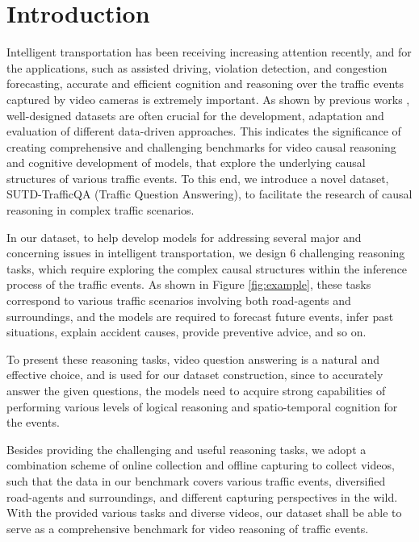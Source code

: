 \documentclass[final]{cvpr}
\begin{document}
\section{Introduction}

Intelligent transportation \cite{5959985} has been receiving increasing attention recently, and for the applications, such as assisted driving, violation detection, and congestion forecasting, accurate and efficient cognition and reasoning over the traffic events captured by video cameras is extremely important. As shown by previous works \cite{10.3115/1073012.1073017,35179}, well-designed datasets are often crucial for the development, adaptation and evaluation of different data-driven approaches. 
This indicates the significance of creating comprehensive and challenging benchmarks for video causal reasoning
and cognitive development of models, 
that explore the underlying causal structures of various traffic events. To this end, we introduce a novel dataset, SUTD-TrafficQA (Traffic Question Answering), to facilitate the research of causal reasoning in complex traffic scenarios.

In our dataset, to help develop models for addressing several major and concerning issues in intelligent transportation, we design 6 challenging reasoning tasks, which require exploring the complex causal structures within the inference process of the traffic events. As shown in Figure \ref{fig:example},
these tasks correspond to various traffic scenarios involving both road-agents and surroundings, and the models are required to forecast future events, infer past situations, explain accident causes, provide preventive advice, and so on. 

To present these reasoning tasks, video question answering \cite{zhu2017uncovering} is a natural and effective choice, and is used for our dataset construction, since to accurately answer the given questions, the models need to acquire strong capabilities of performing various levels of logical reasoning and spatio-temporal cognition for the events.

Besides providing the challenging and useful reasoning tasks, 
we adopt a combination scheme of online collection and offline capturing to collect videos, such that the data in our benchmark covers various traffic events, diversified road-agents and surroundings, and different capturing perspectives in the wild. With the provided various tasks and diverse videos, our dataset shall be able to serve as a comprehensive benchmark for video reasoning of traffic events.
\end{document}
